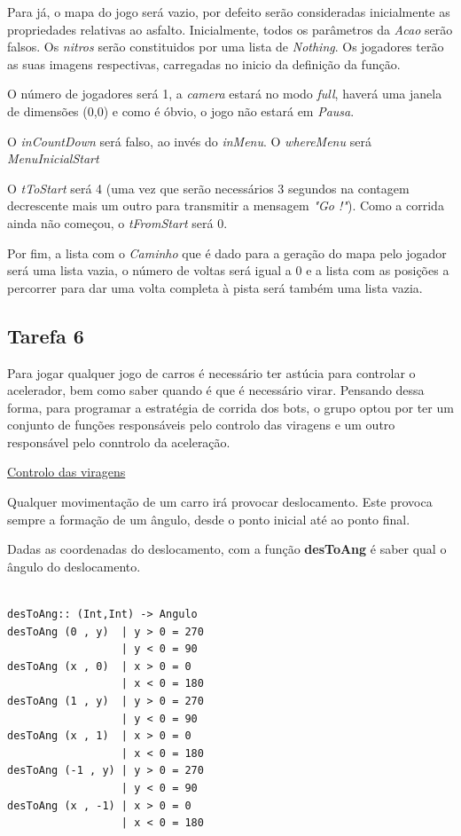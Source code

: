 \documentclass[a4paper]{report} %
\begin{document}
Para já, o mapa do jogo será vazio, por defeito serão consideradas inicialmente as propriedades relativas ao asfalto.
Inicialmente, todos os parâmetros da \emph{Acao} serão falsos. Os \emph{nitros} serão constituidos por uma lista de \emph{Nothing}. Os jogadores terão as suas imagens respectivas, carregadas no inicio da definição da função.

O número de jogadores será 1, a \emph {camera} estará no modo \emph{full}, haverá uma janela de dimensões (0,0) e como é óbvio, o jogo não estará em \emph{Pausa}.

O \emph{inCountDown} será falso, ao invés do \emph{inMenu}. O \emph{whereMenu} será \emph{MenuInicialStart}

O \emph{tToStart} será 4 (uma vez que serão necessários 3 segundos na contagem decrescente mais um outro para transmitir a mensagem \textit{"Go !"}). Como a corrida ainda não começou, o \emph{tFromStart} será 0. 

Por fim, a lista com o \emph{Caminho} que é dado para a geração do mapa pelo jogador será uma lista vazia, o número de voltas será igual a 0 e a lista com as posições a percorrer para dar uma volta completa à pista será também uma lista vazia.

\newpage

\subsection{Tarefa 6}

Para jogar qualquer jogo de carros é necessário ter astúcia para controlar o acelerador, bem como saber quando é que é necessário virar. Pensando dessa forma, para programar a estratégia de corrida dos bots, o grupo optou por ter um conjunto de funções responsáveis pelo controlo das viragens e um outro responsável pelo conntrolo da aceleração.

\maketitle\underline{Controlo das viragens}

Qualquer movimentação de um carro irá provocar deslocamento. Este provoca sempre a formação de um ângulo, desde o ponto inicial até ao ponto final.

Dadas as coordenadas do deslocamento, com a função \textbf{desToAng} é saber qual o ângulo do deslocamento.

\begin{verbatim}

desToAng:: (Int,Int) -> Angulo
desToAng (0 , y)  | y > 0 = 270
                  | y < 0 = 90
desToAng (x , 0)  | x > 0 = 0
                  | x < 0 = 180
desToAng (1 , y)  | y > 0 = 270
                  | y < 0 = 90
desToAng (x , 1)  | x > 0 = 0
                  | x < 0 = 180
desToAng (-1 , y) | y > 0 = 270
                  | y < 0 = 90
desToAng (x , -1) | x > 0 = 0
                  | x < 0 = 180

\end{verbatim}
\end{document}
